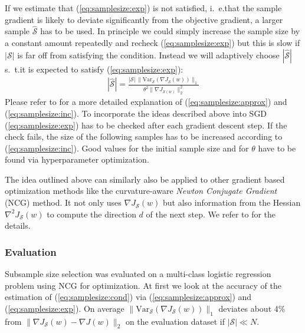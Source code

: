If we estimate that (\ref{eq:samplesize:exp}) is not satisfied, i.~e.\@ that the sample gradient is likely to deviate significantly from the objective gradient, a larger sample \(\widehat{\mathcal{S}}\) has to be used.
In principle we could simply increase the sample size by a constant amount repeatedly and recheck (\ref{eq:samplesize:exp}) but this is slow if \(|\mathcal{S}|\) is far off from satisfying the condition.
Instead we will adaptively choose \(|\widehat{\mathcal{S}}|\) s.~t.\@ it is expected to satisfy (\ref{eq:samplesize:exp}):
\begin{align}
	|\widehat{\mathcal{S}}| = \frac{|\mathcal{S}|\, \|\mathrm{Var}_{\mathcal{S}}(\nabla J_{\mathcal{S}}(w))\|_1}{\theta^2 \|\nabla J_{\mathcal{S}(w)}\|_2^2}\label{eq:samplesize:inc}
\end{align}
Please refer to \citet[chapter~3]{Byrd2012} for a more detailed explanation of (\ref{eq:samplesize:approx}) and (\ref{eq:samplesize:inc}).
To incorporate the ideas described above into SGD (\ref{eq:samplesize:exp}) has to be checked after each gradient descent step.
If the check fails, the size of the following samples has to be increased according to (\ref{eq:samplesize:inc}).
Good values for the initial sample size and for \(\theta\) have to be found via hyperparameter optimization.

The idea outlined above can similarly also be applied to other gradient based optimization methods like the curvature-aware \textit{Newton Conjugate Gradient} (NCG) method.
It not only uses \(\nabla J_{\mathcal{S}}(w)\) but also information from the Hessian \(\nabla^2 J_{\mathcal{S}}(w)\) to compute the direction \(d\) of the next step.
We refer to \citet[chapter~5]{Byrd2012} for the details.

\subsubsection{Evaluation}%
\label{sec:params:samplesize:eval}

Subsample size selection was evaluated on a multi-class logistic regression problem using NCG for optimization.
At first we look at the accuracy of the estimation of (\ref{eq:samplesize:cond}) via (\ref{eq:samplesize:approx}) and (\ref{eq:samplesize:exp}).
On average \(\|\mathrm{Var}_{\mathcal{S}}(\nabla J_{\mathcal{S}}(w))\|_1\) deviates about 4\% from \(\|\nabla J_{\mathcal{S}}(w) - \nabla J(w) \|_2\) on the evaluation dataset if \(|\mathcal{S}| \ll N\).

